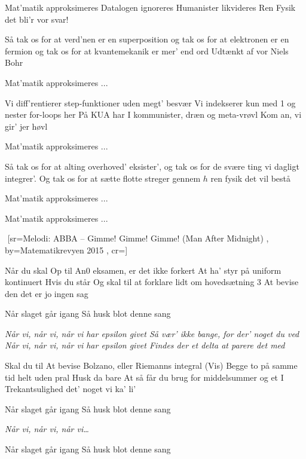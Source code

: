 \documentclass[pdftex,12pt]{article}
\begin{document}
\begin{songs}{}
\endverse
\beginverse
Mat'matik approksimeres
Datalogen ignoreres
Humanister likvideres
Ren Fysik det bli'r vor svar!

\endverse
\beginverse
Så tak os for at verd'nen er en superposition
og tak os for at elektronen er en fermion
og tak os for at kvantemekanik er mer' end ord
Udtænkt af vor Niels Bohr

\endverse
\beginverse
Mat'matik approksimeres ...

\endverse
\beginverse
Vi diff'rentierer step-funktioner uden megt' besvær
Vi indekserer kun med 1 og nester for-loops her
På KUA har I kommunister, dræn og meta-vrøvl
Kom an, vi gir' jer høvl

\endverse
\beginverse
Mat'matik approksimeres ...

\endverse
\beginverse
Så tak os for at alting overhoved' eksister',
og tak os for de svære ting vi dagligt integrer'.
Og tak os for at sætte flotte streger gennem $h$
ren fysik det vil bestå

\endverse
\beginverse
Mat'matik approksimeres ...

\endverse
\beginverse
Mat'matik approksimeres ...

\endverse
\endsong



﻿%
[sr={Melodi: ABBA -- Gimme! Gimme! Gimme! (Man After Midnight)}
,
by={Matematikrevyen 2015}
,
cr={}]\hypertarget{Ode til Analyse 0}{}
\label{song27}

\beginverse
Når du skal
Op til An0 eksamen, er det ikke forkert
At ha' styr på uniform kontinuert
Hvis du står
Og skal til at forklare lidt om hovedsætning 3
At bevise den det er jo ingen sag
\endverse

\beginverse
Når slaget går igang
Så husk blot denne sang
\endverse

\beginverse
\emph{Når vi, når vi, når vi har epsilon givet
Så vær' ikke bange, for der' noget du ved
Når vi, når vi, når vi har epsilon givet
Findes der et delta at parere det med}
\endverse

\beginverse
Skal du til
At bevise Bolzano, eller Riemanns integral
(Vis) Begge to på samme tid helt uden pral
Husk da bare
At så får du brug for middelsummer og et I
Trekantsulighed det' noget vi ka' li'
\endverse

\beginverse
Når slaget går igang
Så husk blot denne sang
\endverse

\beginverse
\emph{Når vi, når vi, når vi\ldots}
\endverse

\beginverse
Når slaget går igang
Så husk blot denne sang
\endverse


\end{songs}
\end{document}

